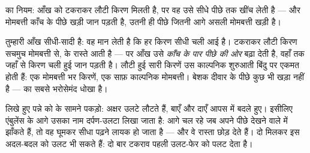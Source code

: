 \begin{omfigure}

{\small {} का नियम: आँख को टकराकर लौटी किरण मिलती है, पर वह
उसे सीधे पीछे तक खींच लेती है --- और मोमबत्ती काँच के पीछे खड़ी जान
पड़ती है, उतनी ही पीछे जितनी आगे असली मोमबत्ती खड़ी है।}
\end{omfigure}

\begin{example}[प्रतिबिंब पीछे क्यों बसता है]\label{ex:g5:mirrors-reflection:why}
तुम्हारी आँख सीधी-सादी है: वह मान लेती है कि हर किरण सीधी चली आई है।
टकराकर लौटी किरण सचमुच मोमबत्ती से,  के रास्ते आती है --- पर
आँख उसे \emph{काँच के पार पीछे की ओर} बढ़ा देती है, वहाँ तक जहाँ से
किरण चली हुई जान पड़ती है। लौटी हुई सारी किरणें उस काल्पनिक शुरुआती
बिंदु पर एकमत होती हैं: एक मोमबत्ती भर किरणें, एक साफ़ काल्पनिक
मोमबत्ती। बेशक दीवार के पीछे कुछ भी खड़ा नहीं है ---  
का सबसे भरोसेमंद धोखा है।
\end{example}

\begin{example}\label{ex:g5:mirrors-reflection:swap}
लिखे हुए पन्ने को  के सामने पकड़ो: अक्षर उलटे लौटते हैं, बाएँ और
दाएँ आपस में बदले हुए। इसीलिए एंबुलेंस के आगे उसका नाम दर्पण-उलटा
लिखा जाता है: आगे चल रहे  जब अपने पीछे देखने वाले  में
झाँकते हैं, तो वह घूमकर सीधा पढ़ने लायक हो जाता है --- और वे रास्ता
छोड़ देते हैं। दो  मिलकर इस अदल-बदल को उलट भी सकते हैं: दो बार
टकराव पहली उलट-फेर को पलट देता है।
\end{example}

